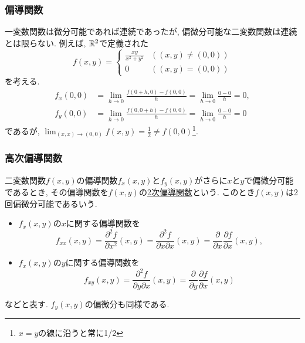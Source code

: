 

\begin{frame}
\frametitle{偏導関数}

一変数関数は微分可能であれば連続であったが, 偏微分可能な二変数関数は連続とは限らない. 
例えば, $\mathbb{R}^2$で定義された
$$
f(x,y)=
\begin{cases}
\frac{xy}{x^2+y^2}  & ((x,y) \ne (0,0)) \\
0 & ((x,y)=(0,0)) 
 \end{cases}
$$
を考える. 
\begin{align*}
f_x(0,0) &=\lim_{h\to 0}\frac{f(0+h,0)-f(0,0)}{h}=\lim_{h\to 0}\frac{0-0}{h}=0, \\
f_y(0,0) &=\lim_{h\to 0}\frac{f(0,0+h)-f(0,0)}{h}=\lim_{h\to 0}\frac{0-0}{h}=0
\end{align*}
であるが, $\displaystyle \lim_{(x,x)\to (0,0)} f(x,y)= \frac{1}{2} \ne f(0,0)$\footnote{$x=y$の線に沿うと常に1/2}. 

\end{frame}





\begin{frame}
\frametitle{高次偏導関数}

\begin{Def}
二変数関数$f(x,y)$の偏導関数$f_x(x,y)$と$f_y(x,y)$がさらに$x$と$y$で偏微分可能であるとき, その偏導関数を$f(x,y)$の\underline{2次偏導関数}という. 
このとき$f(x,y)$は2回偏微分可能であるいう. 
\begin{itemize}
\item $f_x(x,y)$の$x$に関する偏導関数を
$$
f_{xx}(x,y)=\frac{\partial^2 f}{\partial x^2}(x,y)=\frac{\partial^2 f}{\partial x \partial x}(x,y)=\frac{\partial }{\partial x}\frac{\partial f}{\partial x}(x,y), 
$$
\item $f_x(x,y)$の$y$に関する偏導関数を
$$
f_{xy}(x,y)=\frac{\partial^2 f}{\partial y \partial x}(x,y)=\frac{\partial }{\partial y}\frac{\partial f}{\partial x}(x,y)
$$
\end{itemize}
などと表す. $f_y(x,y)$の偏微分も同様である. 
\end{Def}

\end{frame}



